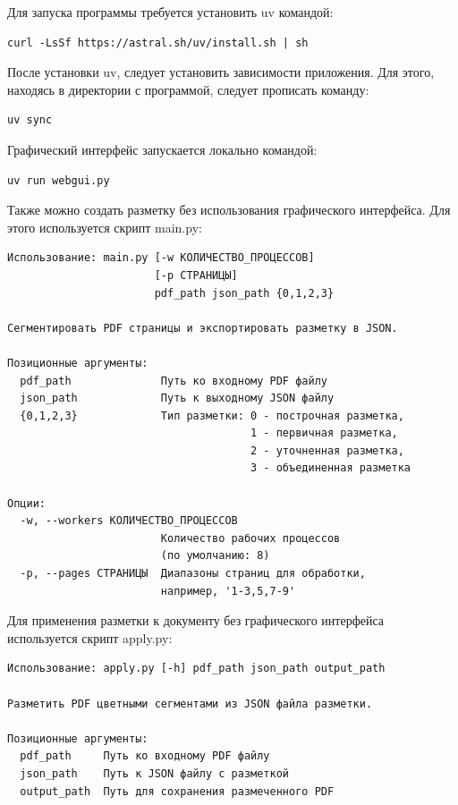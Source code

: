 Для запуска программы требуется установить uv командой:
\begin{lstlisting}[caption={Установка uv}]
curl -LsSf https://astral.sh/uv/install.sh | sh
\end{lstlisting}

После установки uv, следует установить зависимости приложения.
Для этого, находясь в директории с программой, следует прописать команду:
\begin{lstlisting}[caption={Установка зависимостей}]
uv sync
\end{lstlisting}

Графический интерфейс запускается локально командой:
\begin{lstlisting}[caption={Запуск графического веб-интерфейса}]
uv run webgui.py
\end{lstlisting}

Также можно создать разметку без использования графического интерфейса.
Для этого используется скрипт main.py:
\begin{lstlisting}[caption={Запуск скрипта для создания разметки}]
Использование: main.py [-w КОЛИЧЕСТВО_ПРОЦЕССОВ]
                       [-p СТРАНИЦЫ]
                       pdf_path json_path {0,1,2,3}

Сегментировать PDF страницы и экспортировать разметку в JSON.

Позиционные аргументы:
  pdf_path              Путь ко входному PDF файлу
  json_path             Путь к выходному JSON файлу
  {0,1,2,3}             Тип разметки: 0 - построчная разметка,
                                      1 - первичная разметка,
                                      2 - уточненная разметка,
                                      3 - объединенная разметка

Опции:
  -w, --workers КОЛИЧЕСТВО_ПРОЦЕССОВ
                        Количество рабочих процессов
                        (по умолчанию: 8)
  -p, --pages СТРАНИЦЫ  Диапазоны страниц для обработки,
                        например, '1-3,5,7-9'
\end{lstlisting}

Для применения разметки к документу без графического интерфейса используется скрипт apply.py:
\begin{lstlisting}[caption={Запуск скрипта для применения разметки к PDF документу}]
Использование: apply.py [-h] pdf_path json_path output_path

Разметить PDF цветными сегментами из JSON файла разметки.

Позиционные аргументы:
  pdf_path     Путь ко входному PDF файлу
  json_path    Путь к JSON файлу с разметкой
  output_path  Путь для сохранения размеченного PDF
\end{lstlisting}

